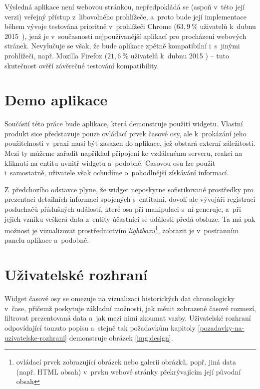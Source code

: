 				Výsledná aplikace není webovou stránkou, nepředpokládá se (aspoň v~této její verzi) veřejný přístup z~libovolného prohlížeče, a~proto bude její implementace během vývoje testována prioritně v~prohlížeči {\sf Chrome} ($63,\!9\ \%$ uživatelů k~dubnu 2015~\cite{w3c-browser}), jenž je v~současnosti nejpoužívanější aplikací pro procházení webových stránek. Nevylučuje se však, že bude aplikace zpětně kompatibilní i~s~jinými prohlížeči, např. {\sf Mozilla Firefox} ($21,\!6\ \%$ uživatelů k~dubnu 2015 \cite{w3c-browser}) -- tuto skutečnost ověří závěrečné testování kompatibility.
		
	\section{Demo aplikace}
	\label{demo-aplikace}
		Součástí této práce bude aplikace, která demonstruje použití widgetu. Vlastní produkt sice představuje pouze ovládací prvek časové osy, ale k~prokázání jeho použitelnosti v~praxi musí být zasazen do aplikace, jež obstará externí záležitosti. Mezi ty můžeme zařadit například připojení ke vzdálenému serveru, reakci na kliknutí na entitu uvnitř widgetu a~podobně. Časovou osu lze použít i~samostatně, uživatele však ochudíme o~pohodlnější získávání informací.
		
	 Z~předchozího odstavce plyne, že widget neposkytne sofistikované pro\-středky pro prezentaci detailních informací spojených s~entitami, dovolí ale vývo\-jáři registraci posluchačů příslušných událostí, které osa při manipulaci s~ní generuje, a~při jejich vzniku veškerá data z~entity účastnící se události předá obsluze. Ta má pak možnost je vizualizovat prostřednictvím \emph{lightboxu}\footnote{ovládací prvek zobrazující obrázek nebo galerii obrázků, popř. jiná data (např. HTML obsah) v~prvku webové stránky překrývajícím její původní obsah}, zobrazit je v~postranním panelu aplikace a~podobně.
		
	\section{Uživatelské rozhraní}
	\label{gui}
		Widget časové osy se omezuje na vizualizaci historických dat chronologicky v~čase, přičemž poskytuje základní možnosti, jak měnit zobrazené časové rozmezí, filtrovat prezentovaná data a~jak mezi nimi zkoumat vazby. Uživatelské rozhraní odpovídající tomuto popisu a~stejně tak požadavkům kapitoly \ref{pozadavky-na-uzivatelske-rozhrani} demonstruje obrázek \ref{img:design}.
		
